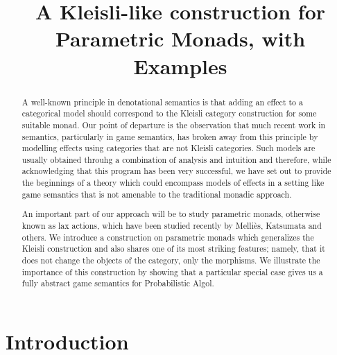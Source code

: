 \documentclass{svproc}
\newcommand\Mellies{Melli\`{e}s\xspace}
\begin{document}
\mainmatter              %
%
\title{A Kleisli-like construction for Parametric Monads, with Examples}
%
%
\author{}
%
\authorrunning{} %
%
\tocauthor{}
%

\maketitle              %

\begin{abstract}
  A well-known principle in denotational semantics is that adding an effect to a categorical model should correspond to the Kleisli category construction for some suitable monad.  
  Our point of departure is the observation that much recent work in semantics, particularly in game semantics, has broken away from this principle by modelling effects using categories that are not Kleisli categories.  
  Such models are usually obtained throuhg a combination of analysis and intuition and therefore, while acknowledging that this program has been very successful, we have set out to provide the beginnings of a theory which could encompass models of effects in a setting like game semantics that is not amenable to the traditional monadic approach.  

  An important part of our approach will be to study parametric monads, otherwise known as lax actions, which have been studied recently by \Mellies, Katsumata and others.  
  We introduce a construction on parametric monads which generalizes the Kleisli construction and also shares one of its most striking features; namely, that it does not change the objects of the category, only the morphisms.
  We illustrate the importance of this construction by showing that a particular special case gives us a fully abstract game semantics for Probabilistic Algol.
\end{abstract}

\section{Introduction}
\end{document}
